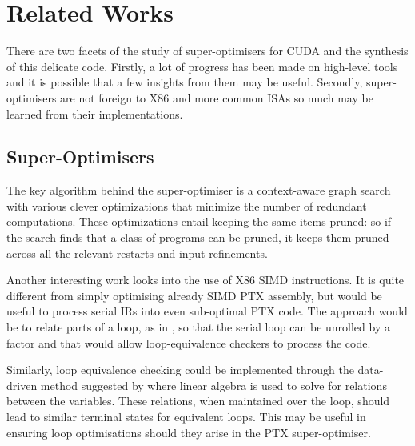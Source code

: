 \documentclass[letterpaper,twocolumn,10pt]{article}
\begin{document}
\section{Related Works}

There are two facets of the study of super-optimisers for
CUDA and the synthesis of this delicate code. Firstly, a lot
of progress has been made on high-level tools and it is possible
that a few insights from them may be useful. Secondly, super-optimisers
are not foreign to X86 and more common ISAs so much may be learned from
their implementations.

\subsection{Super-Optimisers}

The key algorithm behind the super-optimiser \cite{superopt}
is a context-aware graph search with various clever
optimizations that minimize the number of redundant computations.
These optimizations entail keeping the same items pruned:
so if the search finds that a class of programs
can be pruned, it keeps them pruned across all
the relevant restarts and input refinements.

%

Another interesting work looks into the use of X86
SIMD instructions. It is quite different from simply
optimising already SIMD PTX assembly, but would be
useful to process serial IRs into even sub-optimal PTX code.
The approach would be to relate parts of a loop,
as in \cite{SIMDSynth}, so that the serial loop can be
unrolled by a factor and that would allow loop-equivalence
checkers to process the code.

Similarly, loop equivalence checking could be implemented
through the data-driven method suggested by \cite{DataEquiv}
where linear algebra is used to solve for relations between
the variables. These relations, when maintained over the loop,
should lead to similar terminal states for equivalent loops.
This may be useful in ensuring loop optimisations should
they arise in the PTX super-optimiser.
\end{document}
